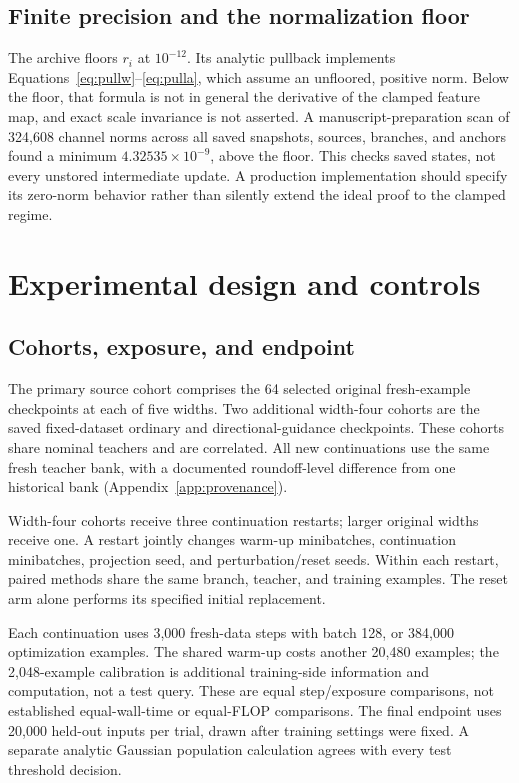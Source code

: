 \documentclass[11pt,letterpaper]{article}
\theoremstyle{remark}\newtheorem{remark}{Remark}
\begin{document}
\subsection{Finite precision and the normalization floor}\label{sec:floor}
The archive floors $r_i$ at $10^{-12}$. Its analytic pullback implements Equations~\eqref{eq:pullw}--\eqref{eq:pulla}, which assume an unfloored, positive norm. Below the floor, that formula is not in general the derivative of the clamped feature map, and exact scale invariance is not asserted. A manuscript-preparation scan of 324,608 channel norms across all saved snapshots, sources, branches, and anchors found a minimum $4.32535\times10^{-9}$, above the floor. This checks saved states, not every unstored intermediate update. A production implementation should specify its zero-norm behavior rather than silently extend the ideal proof to the clamped regime.

\section{Experimental design and controls}\label{sec:design}
\subsection{Cohorts, exposure, and endpoint}
The primary source cohort comprises the 64 selected original fresh-example checkpoints at each of five widths. Two additional width-four cohorts are the saved fixed-dataset ordinary and directional-guidance checkpoints. These cohorts share nominal teachers and are correlated. All new continuations use the same fresh teacher bank, with a documented roundoff-level difference from one historical bank (Appendix~\ref{app:provenance}).

Width-four cohorts receive three continuation restarts; larger original widths receive one. A restart jointly changes warm-up minibatches, continuation minibatches, projection seed, and perturbation/reset seeds. Within each restart, paired methods share the same branch, teacher, and training examples. The reset arm alone performs its specified initial replacement.

Each continuation uses 3,000 fresh-data steps with batch 128, or 384,000 optimization examples. The shared warm-up costs another 20,480 examples; the 2,048-example calibration is additional training-side information and computation, not a test query. These are equal step/exposure comparisons, not established equal-wall-time or equal-FLOP comparisons. The final endpoint uses 20,000 held-out inputs per trial, drawn after training settings were fixed. A separate analytic Gaussian population calculation agrees with every test threshold decision.
\end{document}
